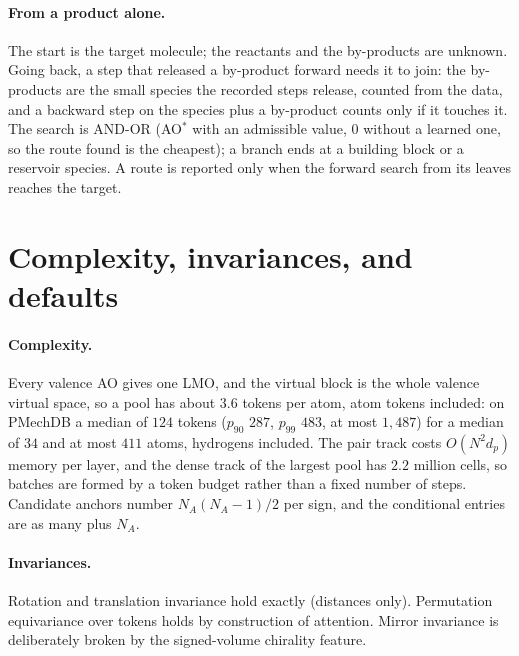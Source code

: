 \documentclass[11pt,a4paper]{article}
\begin{document}
\paragraph{From a product alone.} The start is the target molecule; the reactants and the by-products are unknown. Going back, a step that released a by-product forward needs it to join: the by-products are the small species the recorded steps release, counted from the data, and a backward step on the species plus a by-product counts only if it touches it. The search is AND-OR (AO$^*$ with an admissible value, 0 without a learned one, so the route found is the cheapest); a branch ends at a building block or a reservoir species. A route is reported only when the forward search from its leaves reaches the target.

\section{Complexity, invariances, and defaults}

\paragraph{Complexity.} Every valence AO gives one LMO, and the virtual block is the whole valence virtual space, so a pool has about $3.6$ tokens per atom, atom tokens included: on PMechDB a median of $124$ tokens ($p_{90}$ $287$, $p_{99}$ $483$, at most $1{,}487$) for a median of $34$ and at most $411$ atoms, hydrogens included. The pair track costs $O(N^2 d_p)$ memory per layer, and the dense track of the largest pool has $2.2$ million cells, so batches are formed by a token budget rather than a fixed number of steps. Candidate anchors number $N_A(N_A-1)/2$ per sign, and the conditional entries are as many plus $N_A$.

\paragraph{Invariances.} Rotation and translation invariance hold exactly (distances only). Permutation equivariance over tokens holds by construction of attention. Mirror invariance is deliberately broken by the signed-volume chirality feature.
\end{document}

